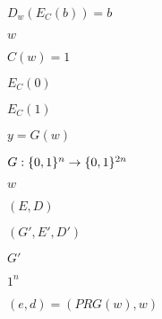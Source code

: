 \documentclass[10pt]{book}
\begin{document}
\begin{mdSnippets}
\begin{mdInlineSnippet}[2f4fd0382d214a35959ab0abef4b057b]%
$D_w(E_C(b))=b$\end{mdInlineSnippet}%
\begin{mdInlineSnippet}[f1290186a5d0b1ceab27f4e77c0c5d68]%
$w$\end{mdInlineSnippet}%
\begin{mdInlineSnippet}[b015683b0a5582f7727f9131328fe2af]%
$C(w)=1$\end{mdInlineSnippet}%
\begin{mdInlineSnippet}[bc42b3eafcc746a8e5506c2e9f187808]%
$E_C(0)$\end{mdInlineSnippet}%
\begin{mdInlineSnippet}%
$E_C(1)$\end{mdInlineSnippet}%
\begin{mdInlineSnippet}[490577c8aa24328db5a7afb7511d955a]%
$y=G(w)$\end{mdInlineSnippet}%
\begin{mdInlineSnippet}[1a9a4c9c2074cd86fb1bb795c7cd4e27]%
$G:\{0,1\}^n\rightarrow\{0,1\}^{2n}$\end{mdInlineSnippet}%
\begin{mdInlineSnippet}[f1290186a5d0b1ceab27f4e77c0c5d68]%
$w$\end{mdInlineSnippet}%
\begin{mdInlineSnippet}[c150726dc018e82825c0c3617f46a1c9]%
$(E,D)$\end{mdInlineSnippet}%
\begin{mdInlineSnippet}[96822b145cbde12fe29d715f95c7849e]%
$(G',E',D')$\end{mdInlineSnippet}%
\begin{mdInlineSnippet}[b1c5660b1392ecb094b31a0e42253ff9]%
$G'$\end{mdInlineSnippet}%
\begin{mdInlineSnippet}%
$1^n$\end{mdInlineSnippet}%
\begin{mdInlineSnippet}[7121a6182ec13ba42c4ab84f61d47849]%
$(e,d) = (PRG(w), w)$\end{mdInlineSnippet}%
\begin{mdInlineSnippet}[3d82b817f50058751828b133814c8acd]%

\end{mdInlineSnippet}
\end{mdSnippets}
\end{document}
